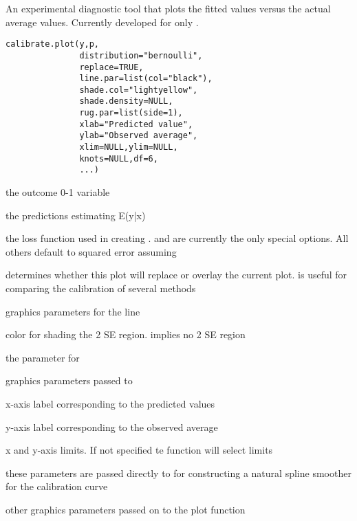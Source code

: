 \begin{Description}\relax
An experimental diagnostic tool that plots the fitted values versus the actual average values.
Currently developed for only .
\end{Description}
\begin{Usage}
\begin{verbatim}
calibrate.plot(y,p,
               distribution="bernoulli",
               replace=TRUE,
               line.par=list(col="black"),
               shade.col="lightyellow",
               shade.density=NULL,
               rug.par=list(side=1),
               xlab="Predicted value",
               ylab="Observed average",
               xlim=NULL,ylim=NULL,
               knots=NULL,df=6,
               ...)
\end{verbatim}
\end{Usage}
\begin{Arguments}
\begin{ldescription}
\item[\code{y}] the outcome 0-1 variable 
\item[\code{p}] the predictions estimating E(y|x) 
\item[\code{distribution}] the loss function used in creating .
 and  are currently the
only special options. All others default to squared error
assuming 
\item[\code{replace}] determines whether this plot will replace or overlay the current plot.
 is useful for comparing the calibration of several
methods
\item[\code{line.par}] graphics parameters for the line 
\item[\code{shade.col}] color for shading the 2 SE region.  implies no 2 SE
region
\item[\code{shade.density}] the  parameter for 
\item[\code{rug.par}] graphics parameters passed to 
\item[\code{xlab}] x-axis label corresponding to the predicted values
\item[\code{ylab}] y-axis label corresponding to the observed average
\item[\code{xlim,ylim}] x and y-axis limits. If not specified te function will select
limits
\item[\code{knots,df}] these parameters are passed directly to 
 for constructing a natural spline 
smoother for the calibration curve
\item[\code{...}] other graphics parameters passed on to the plot function 
\end{ldescription}
\end{Arguments}
